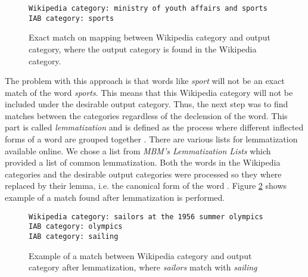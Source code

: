 \begin{figure}[h]
\centering
\begin{lstlisting}
Wikipedia category: ministry of youth affairs and sports
IAB category: sports
\end{lstlisting}
\caption[Mapping between Wikipedia category and output category]{Exact match on mapping between Wikipedia category and output category, where the output category is found in the Wikipedia category.}
\label{fig:catmapping_exactmatch}
\end{figure}
The problem with this approach is that words like \emph{sport} will not be an exact match of the word \emph{sports}. This means that this Wikipedia category will not be included under the desirable output category. Thus, the next step was to find matches between the categories regardless of the declension of the word. This part is called \emph{lemmatization} and is defined as the process where different inflected forms of a word are grouped together \cite[p.~30-33]{iirbook}. There are various lists for lemmatization available online. We chose a list from \emph{MBM's Lemmatization Lists} \cite{lemmatizationlist} which provided a list of common lemmatization. Both the words in the Wikipedia categories and the desirable output categories were processed so they where replaced by their lemma, i.e. the canonical form of the word \cite[][p. 30]{iirbook}. 
Figure \ref{fig:catmapping_lemmamatch} shows example of a match found after lemmatization is performed. 

\begin{figure}[h]
\centering
\begin{lstlisting}
Wikipedia category: sailors at the 1956 summer olympics
IAB category: olympics
IAB category: sailing
\end{lstlisting}
\caption[Example of match after lemmatization]{Example of a match between Wikipedia category and output category after lemmatization, where \emph{sailors} match with \emph{sailing}}
\label{fig:catmapping_lemmamatch}
\end{figure}

\begin{comment}
\subsubsection{Categories not relevant for classification}
Not all categories are suitable for classification, some categories are still just relevant for maintaining a well-structured encyclopedia. Example of such categories are \emph{container categories}, which are categories only containing subcategories. All container categories where found by looking at the file asdfasdf  . Some of these categories have already been removed because they are also hidden categories, but a total of 69 023 categories could be disregarded for this purpose. 
\end{comment}


